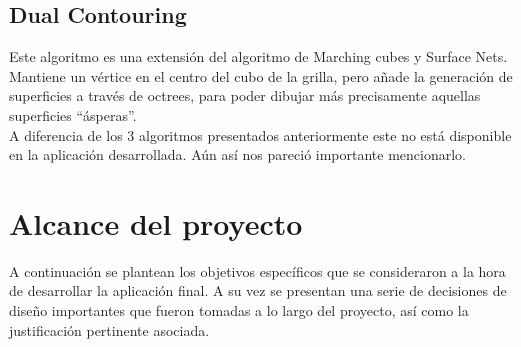 \documentclass[12pt]{article}
\begin{document}
\subsection{Dual Contouring}
Este algoritmo es una extensión del algoritmo de Marching cubes y Surface Nets. Mantiene un vértice en el centro del cubo de la grilla, pero añade la generación de superficies a través de octrees, para poder dibujar más precisamente aquellas superficies “ásperas”. \\A diferencia de los 3 algoritmos presentados anteriormente este no está disponible en la aplicación desarrollada. Aún así nos pareció importante mencionarlo\cite{dualcontour}.
\clearpage
\section{Alcance del proyecto}
A continuación se plantean los objetivos específicos que se consideraron a la hora de desarrollar la aplicación final. A su vez se presentan una serie de decisiones de diseño importantes que fueron tomadas a lo largo del proyecto, así como la justificación pertinente asociada.
\end{document}
